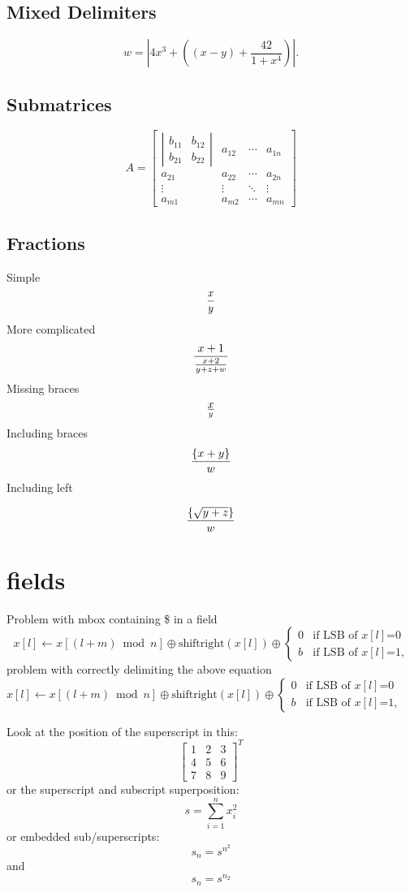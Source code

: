 \documentclass{article}
\begin{document}
\subsection{Mixed Delimiters}
\[
w =  \left| 4 x^3 + \left( (x-y) + \frac{42}{1+x^4} \right) \right|.
\]

\subsection{Submatrices}
\[
A = \left[ \begin{array}{cccc}
\left|\begin{array}{cc}
b_{11}&b_{12}\\
b_{21}&b_{22}
\end{array}\right|
 & a_{12} & \cdots & a_{1n}\\
a_{21} & a_{22} & \cdots & a_{2n}\\
\vdots & \vdots & \ddots & \vdots\\
a_{m1} & a_{m2} & \cdots & a_{mn}
\end{array} \right]
\]

\subsection{Fractions}
Simple
\[
{x \over y}
\]
More complicated
\[
{x+1 \over {x+2 \over y+z +w}}
\]
Missing braces
\[
x \over y
\]
Including braces
\[
{\{ x+y \} \over w}
\]
Including left

\[
{\left\{\sqrt{y+z}\right\}\over w}
\]

\section{fields}
Problem with mbox containing \$ in a field
\[
x[l]\leftarrow x[(l+m) \bmod  n] \oplus \mbox{shiftright}(x[l])
 \oplus \left\{ \begin{array}{ll}
                0   & \mbox{if LSB of $x[l]$=0} \\
                b   & \mbox{if LSB of $x[l]$=1,}
               \end{array}
        \right.
\]
problem with correctly delimiting the above equation 
$
x[l]\leftarrow x[(l+m) \bmod  n] \oplus \mbox{shiftright}(x[l])
 \oplus \left\{ \begin{array}{ll}
                0   & \mbox{if LSB of $x[l]$=0} \\
                b   & \mbox{if LSB of $x[l]$=1,}
               \end{array}
        \right.
$

Look at the position of the superscript in this:
\[
  \left[
    \begin{array}{ccc}
      1 & 2 & 3\\
      4 & 5 & 6\\
      7 & 8 & 9
    \end{array}
  \right]^T
\]
or the superscript and subscript superposition:
\[
  s = \sum_{i=1}^n x^2_i
\]
or embedded sub/superscripts:
\[
  s_n=s^{n^2}
\]
and
\[
  s_n=s^{n_2}
\]
\end{document}
